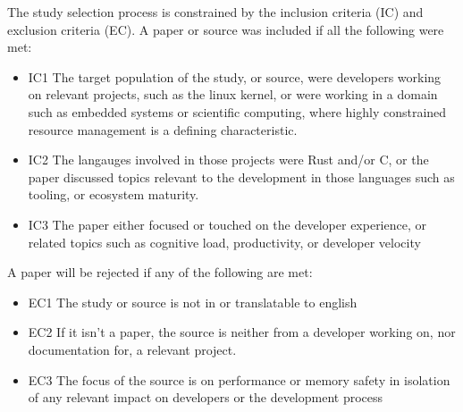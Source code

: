 \documentclass[conference]{IEEEtran}
\begin{document}
The study selection process is constrained by the inclusion criteria (IC) and exclusion criteria (EC). A paper or source was included if all the following were met:
\begin{itemize}
    \item IC1 The target population of the study, or source, were developers working on relevant projects, such as the linux kernel, or were working in a domain such as embedded systems or scientific computing, where highly constrained resource management is a defining characteristic.
    \item IC2 The langauges involved in those projects were Rust and/or C, or the paper discussed topics relevant to the development in those languages such as tooling, or ecosystem maturity.
    \item IC3 The paper either focused or touched on the developer experience, or related topics such as cognitive load, productivity, or developer velocity
\end{itemize}
A paper will be rejected if any of the following are met:
\begin{itemize}
    \item EC1 The study or source is not in or translatable to english
    \item EC2 If it isn't a paper, the source is neither from a developer working on, nor documentation for, a relevant project.
    \item EC3 The focus of the source is on performance or memory safety in isolation of any relevant impact on developers or the development process
\end{itemize}
\end{document}
